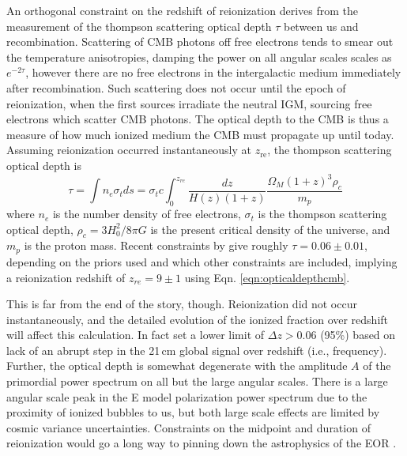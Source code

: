 An orthogonal constraint on the redshift of reionization derives from the measurement of the thompson scattering optical depth $\tau$ between us and recombination. Scattering of CMB photons off free electrons tends to smear out the temperature anisotropies, damping the power on all angular scales scales as $e^{-2\tau}$, however there are no free electrons in the intergalactic medium immediately after recombination. Such scattering does not occur until the epoch of reionization, when the first sources irradiate the neutral IGM, sourcing free electrons which scatter CMB photons. The optical depth to the CMB is thus a measure of how much ionized medium the CMB must propagate up until today. Assuming reionization occurred instantaneously at $z_\text{re}$, the thompson scattering optical depth is 
\begin{equation}
\label{eqn:opticaldepthcmb}
	\tau=\int n_e\sigma_t ds=\sigma_t c\int_0^{z_{re}}\frac{dz}{H(z)(1+z)}\frac{\Omega_M(1+z)^3\rho_c}{m_p}
\end{equation}
where $n_e$ is the number density of free electrons, $\sigma_t$ is the thompson scattering optical depth, $\rho_c=3H_0^2/8\pi G$ is the present critical density of the universe, and $m_p$ is the proton mass. Recent constraints by \citep{plancktau16} give roughly $\tau=0.06\pm0.01$, depending on the priors used and which other constraints are included, implying a reionization redshift of $z_{re}=9\pm1$ using Eqn. \ref{eqn:opticaldepthcmb}.

This is far from the end of the story, though. Reionization did not occur instantaneously, and the detailed evolution of the ionized fraction over redshift will affect this calculation. In fact \citet{bowman2010} set a lower limit of $\Delta z>0.06$ (95\%) based on lack of an abrupt step in the 21\,cm global signal over redshift (i.e., frequency). Further, the optical depth is somewhat degenerate with the amplitude $A$ of the primordial power spectrum on all but the large angular scales. There is a large angular scale peak in the E model polarization power spectrum due to the proximity of ionized bubbles to us, but both large scale effects are limited by cosmic variance uncertainties. Constraints on the midpoint and duration of reionization would go a long way to pinning down the astrophysics of the EOR \citep{liu15a}.

